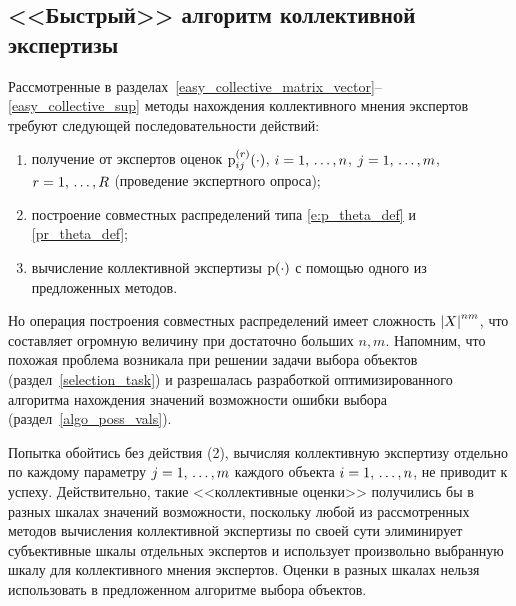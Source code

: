 \subsection{<<Быстрый>> алгоритм коллективной экспертизы }

Рассмотренные в разделах~\ref{easy_collective_matrix_vector}--\ref{easy_collective_sup} методы нахождения коллективного мнения экспертов требуют следующей последовательности действий: 
\begin{enumerate}
\item получение от экспертов оценок ${\mathrm{p}}_{ij}^{(r)}(\cdot)$, $i = 1,\, \ldots, n$, $j = 1,\, \ldots, m$, $r = 1,\, \ldots, R$ (проведение экспертного опроса);
\item построение совместных распределений типа \eqref{e:p_theta_def} и \eqref{pr_theta_def};
\item вычисление коллективной экспертизы  ${\mathrm{p}}(\cdot)$ с помощью одного из предложенных методов.
\end{enumerate}

Но операция построения  совместных распределений имеет сложность $\left| X \right|^{nm}$, что составляет огромную величину при достаточно больших $n, m$. Напомним, что похожая проблема возникала при решении задачи выбора объектов (раздел~\ref{selection_task}) и разрешалась разработкой оптимизированного алгоритма нахождения значений возможности ошибки выбора (раздел~\ref{algo_poss_vals}). %

Попытка обойтись без действия (2), вычисляя коллективную экспертизу отдельно по каждому параметру $j = 1,\, \ldots, m$ каждого объекта $i = 1,\, \ldots, n$, не приводит к успеху. Действительно, такие <<коллективные оценки>> получились бы в разных шкалах значений возможности, поскольку любой из рассмотренных методов вычисления коллективной экспертизы по своей сути элиминирует субъективные шкалы отдельных экспертов и использует произвольно выбранную шкалу для коллективного мнения экспертов. Оценки в разных шкалах нельзя использовать в предложенном алгоритме выбора объектов.

